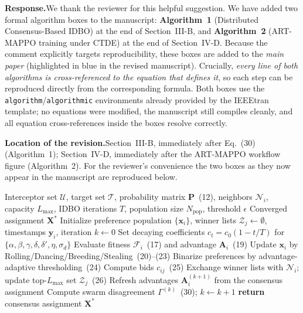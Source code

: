 \documentclass[11pt]{article}
\newcommand{\rsp}{\medskip\noindent\textbf{Response.}\quad}
\newcommand{\loc}{\medskip\noindent\textbf{Location of the revision.}\quad}
\begin{document}
\rsp We thank the reviewer for this helpful suggestion. We have added two formal
algorithm boxes to the manuscript: \textbf{Algorithm~1} (Distributed
Consensus-Based IDBO) at the end of Section~III-B, and \textbf{Algorithm~2}
(ART-MAPPO training under CTDE) at the end of Section~IV-D. Because the comment
explicitly targets reproducibility, these boxes are added to the \emph{main paper}
(highlighted in blue in the revised manuscript). Crucially, \emph{every line of
both algorithms is cross-referenced to the equation that defines it}, so each step
can be reproduced directly from the corresponding formula. Both boxes use the
\texttt{algorithm}/\texttt{algorithmic} environments already provided by the
IEEEtran template; no equations were modified, the manuscript still compiles
cleanly, and all equation cross-references inside the boxes resolve correctly.

\loc Section~III-B, immediately after Eq.~(30) (Algorithm~1); Section~IV-D,
immediately after the ART-MAPPO workflow figure (Algorithm~2). For the reviewer's
convenience the two boxes as they now appear in the manuscript are reproduced below.

\begin{algorithm}[H]
\caption{Distributed Consensus-Based IDBO for Cooperative Target Assignment (per interceptor $u_i$)}
\begin{algorithmic}[1]
\REQUIRE Interceptor set $\mathcal{U}$, target set $\mathcal{T}$, probability matrix $\mathbf{P}$~(12), neighbors $\mathcal{N}_i$, capacity $L_{\max}$, IDBO iterations $T$, population size $N_{\mathrm{pop}}$, threshold $\epsilon$
\ENSURE Converged assignment $\mathbf{X}^\ast$
\STATE Initialize preference population $\{\mathbf{x}_i\}$, winner lists $\mathcal{Z}_j\!\leftarrow\!\emptyset$, timestamps $\mathbf{y}_i$, iteration $k\!\leftarrow\!0$
\REPEAT
    \STATE Set decaying coefficients $c_t=c_0(1-t/T)$ for $\{\alpha,\beta,\gamma,\delta,\delta',\eta,\sigma_d\}$
    \STATE Evaluate fitness $\mathcal{F}_i$~(17) and advantage $\mathbf{A}_i$~(19)
    \STATE Update $\mathbf{x}_i$ by Rolling/Dancing/Breeding/Stealing~(20)--(23)
  \ENDFOR
  \STATE Binarize preferences by advantage-adaptive thresholding~(24)
  \STATE Compute bids $c_{ij}$~(25)
  \STATE Exchange winner lists with $\mathcal{N}_i$; update top-$L_{\max}$ set $\mathcal{Z}_j$~(26)
  \STATE Refresh advantages $\mathbf{A}_i^{(k+1)}$ from the consensus assignment
  \STATE Compute swarm disagreement $\Gamma^{(k)}$~(30);\; $k\!\leftarrow\!k+1$
\STATE \textbf{return} consensus assignment $\mathbf{X}^\ast$
\end{algorithmic}
\end{algorithm}
\end{document}
